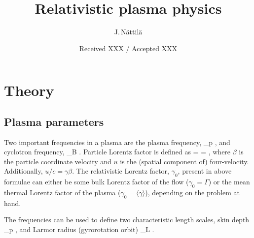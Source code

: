 \documentclass{aa}
\begin{document}
\title{Relativistic plasma physics}

\author{J.\,N\"attil\"a}


\date{Received XXX / Accepted XXX}





\maketitle


\section{Theory}\label{sect:theory}

\subsection{Plasma parameters}

Two important frequencies in a plasma are the plasma frequency,
\be
\omega_p \equiv {},
\ee
and cyclotron frequency,
\be
\omega_B \equiv {}.
\ee
Particle Lorentz factor is defined as
\be
\gamma =  = ,
\ee
where $\beta$ is the particle coordinate velocity and $u$ is the (spatial component of) four-velocity.
Additionally, $u/c = \gamma \beta$.
The relativistic Lorentz factor, $\gamma_0$, present in above formulae can either be some bulk Lorentz factor of the flow ($\gamma_0 = \Gamma$) or the mean thermal Lorentz factor of the plasma ($\gamma_0 = \langle \gamma \rangle$), depending on the problem at hand.

The frequencies can be used to define two characteristic length scales, skin depth
\be
\lambda_p \equiv {},
\ee
and Larmor radius (gyrorotation orbit)
\be
\lambda_L \equiv {}.
\ee
\end{document}
